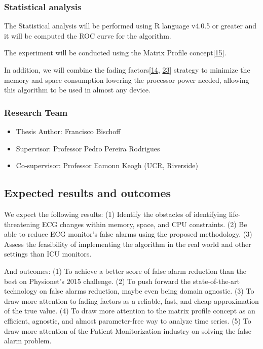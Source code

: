 \documentclass[
]{article}
\providecommand{\tightlist}{%
  \setlength{\itemsep}{0pt}\setlength{\parskip}{0pt}}
\begin{document}
\hypertarget{statistical-analysis}{%
\subsubsection{Statistical analysis}\label{statistical-analysis}}

The Statistical analysis will be performed using R language v4.0.5 or
greater and it will be computed the ROC curve for the algorithm.

The experiment will be conducted using the Matrix Profile
concept{[}\protect\hyperlink{ref-gharghabi2018}{15}{]}.

In addition, we will combine the fading
factors{[}\protect\hyperlink{ref-Gama2013}{14},
\protect\hyperlink{ref-Rodrigues2010}{23}{]} strategy to minimize the
memory and space consumption lowering the processor power needed,
allowing this algorithm to be used in almost any device.

\hypertarget{research-team}{%
\subsubsection{Research Team}\label{research-team}}

\begin{itemize}
\tightlist
\item
  Thesis Author: Francisco Bischoff
\item
  Supervisor: Professor Pedro Pereira Rodrigues
\item
  Co-supervisor: Professor Eamonn Keogh (UCR, Riverside)
\end{itemize}

\hypertarget{expected-results-and-outcomes}{%
\subsection{Expected results and
outcomes}\label{expected-results-and-outcomes}}

We expect the following results: (1) Identify the obstacles of
identifying life-threatening ECG changes within memory, space, and CPU
constraints. (2) Be able to reduce ECG monitor's false alarms using the
proposed methodology. (3) Assess the feasibility of implementing the
algorithm in the real world and other settings than ICU monitors.

And outcomes: (1) To achieve a better score of false alarm reduction
than the best on Physionet's 2015 challenge. (2) To push forward the
state-of-the-art technology on false alarms reduction, maybe even being
domain agnostic. (3) To draw more attention to fading factors as a
reliable, fast, and cheap approximation of the true value. (4) To draw
more attention to the matrix profile concept as an efficient, agnostic,
and almost parameter-free way to analyze time series. (5) To draw more
attention of the Patient Monitorization industry on solving the false
alarm problem.
\end{document}
